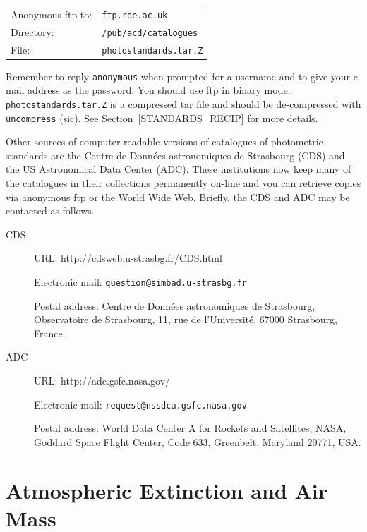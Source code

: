 \documentclass[twoside,11pt,nolof]{starlink}
\begin{document}
\begin{tabular}{ll}
Anonymous ftp to: & \texttt{ftp.roe.ac.uk}        \\
Directory:        & \texttt{/pub/acd/catalogues}  \\
File:             & \texttt{photostandards.tar.Z} \\
\end{tabular}

Remember to reply \texttt{anonymous} when prompted for a username and
to give your e-mail address as the password.  You should use ftp in
binary mode.  \texttt{photostandards.tar.Z} is a compressed tar file
and should be de-compressed with \texttt{uncompress} (sic).  See
Section~\ref{STANDARDS_RECIP} for more details.

Other sources of computer-readable versions of catalogues of photometric
standards are the Centre de Donn\'{e}es astronomiques de Strasbourg (CDS)
and the US Astronomical Data Center (ADC).  These institutions now keep
many of the catalogues in their collections permanently on-line and you
can retrieve copies via anonymous ftp or the World Wide Web.  Briefly,
the CDS and ADC may be contacted as follows.

\begin{description}

  \item[CDS] URL:
   {http://cdsweb.u-strasbg.fr/CDS.html}

   Electronic mail: \texttt{question@simbad.u-strasbg.fr}

   Postal address: Centre de Donn\'{e}es astronomiques de
   Strasbourg, Observatoire de Strasbourg, 11, rue de l'Universit\'{e},
   67000 Strasbourg, France.

  \item[ADC]  URL: 
   {http://adc.gsfc.nasa.gov/}

   Electronic mail: \texttt{request@nssdca.gsfc.nasa.gov}

   Postal address: World Data Center A for Rockets and
   Satellites, NASA, Goddard Space Flight Center, Code 633,
   Greenbelt, Maryland 20771, USA.

\end{description}


\section{\label{AIRMASS}Atmospheric Extinction and Air Mass}
\end{document}

